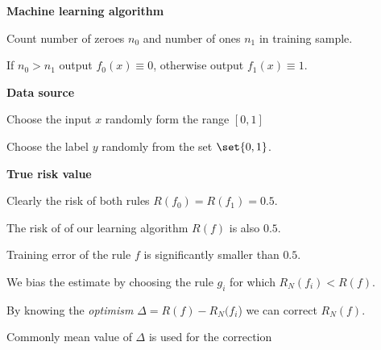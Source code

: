 \documentclass[landscape,footrule]{foils}
\begin{document}
\foilhead[-1cm]{}



\textbf{Machine learning algorithm}
\begin{triangles}
\item Count number of zeroes $n_0$ and number of ones $n_1$ in training sample.
\item If $n_0>n_1$ output $f_0(x)\equiv 0$, otherwise output $f_1(x)\equiv 1$.
\end{triangles}
\vspace*{1cm}

\textbf{Data source}
\begin{triangles}
\item Choose the input $x$ randomly form the range $[0,1]$
\item Choose the label $y$ randomly from the set $\set{0,1}$.
\end{triangles}

\vspace*{1cm}
\textbf{True risk value}
\begin{triangles}
\item Clearly the risk of both rules $R(f_0)=R(f_1)=0.5$.
\item The risk of of our learning algorithm $R(f)$ is also $0.5$. 
\end{triangles}


\foilhead[-1cm]{}



\vspace*{-0.5cm}

Training error of the rule $f$ is significantly smaller than $0.5$.
\begin{triangles}
\item We bias the estimate by choosing the rule $g_i$ for which $R_N(f_i) < R(f)$.
\end{triangles}


\vspace*{-0.5cm}
By knowing the \emph{optimism} $\Delta=R(f)-R_N(f_i$) we can correct $R_N(f)$.   
\begin{triangles}
\item Commonly mean value of $\Delta$ is used for the correction 
\end{triangles}
\end{document}
